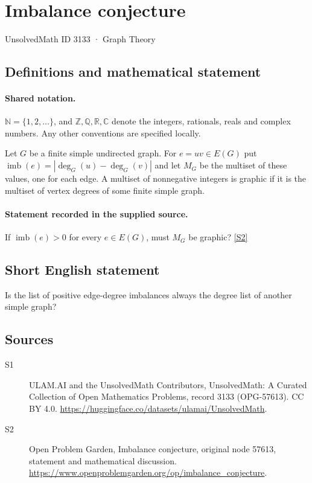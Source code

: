 \documentclass[11pt]{article}
\newcommand{\sref}[2]{\hyperlink{source:#1:#2}{[S#2]}}
\begin{document}
\setcounter{section}{3132}
\section{Imbalance conjecture}\label{3133}
{\small\sffamily UnsolvedMath ID 3133 · Graph Theory}
\subsection{Definitions and mathematical statement}

\paragraph{Shared notation.}$\mathbb N=\{1,2,\ldots\}$, and $\mathbb Z,\mathbb Q,\mathbb R,\mathbb C$ denote the integers, rationals, reals and complex numbers. Any other conventions are specified locally.


Let $G$ be a finite simple undirected graph. For $e=uv\in E(G)$ put $\operatorname{imb}(e)=|\deg_G(u)-\deg_G(v)|$ and let $M_G$ be the multiset of these values, one for each edge. A multiset of nonnegative integers is graphic if it is the multiset of vertex degrees of some finite simple graph.
\paragraph{Statement recorded in the supplied source.}
If $\operatorname{imb}(e)>0$ for every $e\in E(G)$, must $M_G$ be graphic? \sref{3133}{2}
\subsection{Short English statement}
Is the list of positive edge-degree imbalances always the degree list of another simple graph?
\subsection{Sources}
\begin{description}
\item[\hypertarget{source:3133:1}{S1}] ULAM.AI and the UnsolvedMath Contributors, UnsolvedMath: A Curated Collection of Open Mathematics Problems, record 3133 (OPG-57613). CC BY 4.0. \url{https://huggingface.co/datasets/ulamai/UnsolvedMath}.
\item[\hypertarget{source:3133:2}{S2}] Open Problem Garden, Imbalance conjecture, original node 57613, statement and mathematical discussion. \url{https://www.openproblemgarden.org/op/imbalance_conjecture}.
\end{description}
\label{end:3133}
\end{document}
